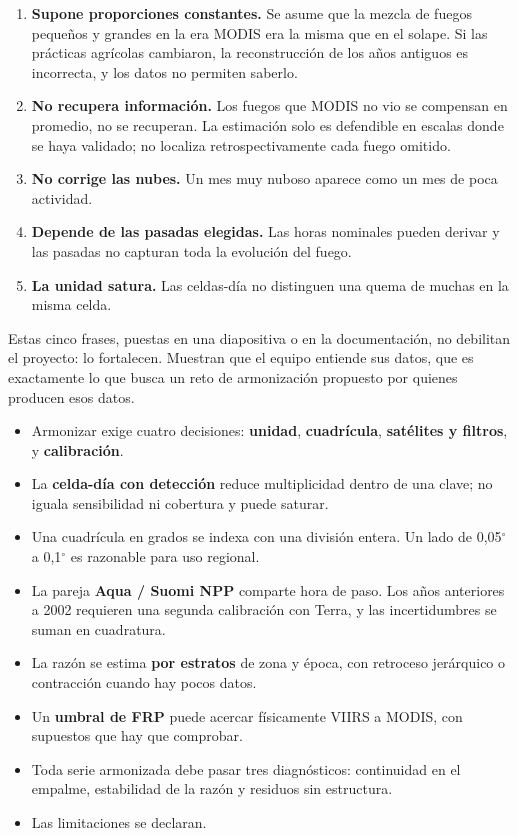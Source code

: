 \begin{enumerate}
  \item \textbf{Supone proporciones constantes.} Se asume que la mezcla de fuegos pequeños y
  grandes en la era MODIS era la misma que en el solape. Si las prácticas agrícolas cambiaron,
  la reconstrucción de los años antiguos es incorrecta, y los datos no permiten saberlo.
  \item \textbf{No recupera información.} Los fuegos que MODIS no vio se compensan en promedio,
  no se recuperan. La estimación solo es defendible en escalas donde se haya validado;
  no localiza retrospectivamente cada fuego omitido.
  \item \textbf{No corrige las nubes.} Un mes muy nuboso aparece como un mes de poca actividad.
  \item \textbf{Depende de las pasadas elegidas.} Las horas nominales pueden derivar y
  las pasadas no capturan toda la evolución del fuego.
  \item \textbf{La unidad satura.} Las celdas-día no distinguen una quema de muchas en la misma
  celda.
\end{enumerate}

\begin{parareto}
Estas cinco frases, puestas en una diapositiva o en la documentación, no debilitan el proyecto:
lo fortalecen. Muestran que el equipo entiende sus datos, que es exactamente lo que busca un
reto de armonización propuesto por quienes producen esos datos.
\end{parareto}

\resumen

\begin{itemize}
  \item Armonizar exige cuatro decisiones: \textbf{unidad}, \textbf{cuadrícula},
  \textbf{satélites y filtros}, y \textbf{calibración}.
  \item La \textbf{celda-día con detección} reduce multiplicidad dentro de una clave;
  no iguala sensibilidad ni cobertura y puede saturar.
  \item Una cuadrícula en grados se indexa con una división entera. Un lado de 0,05$^\circ$ a
  0,1$^\circ$ es razonable para uso regional.
  \item La pareja \textbf{Aqua / Suomi NPP} comparte hora de paso. Los años anteriores a 2002
  requieren una segunda calibración con Terra, y las incertidumbres se suman en cuadratura.
  \item La razón se estima \textbf{por estratos} de zona y época, con retroceso jerárquico o
  contracción cuando hay pocos datos.
  \item Un \textbf{umbral de FRP} puede acercar físicamente VIIRS a MODIS, con supuestos que hay
  que comprobar.
  \item Toda serie armonizada debe pasar tres diagnósticos: continuidad en el empalme,
  estabilidad de la razón y residuos sin estructura.
  \item Las limitaciones se declaran.
\end{itemize}

